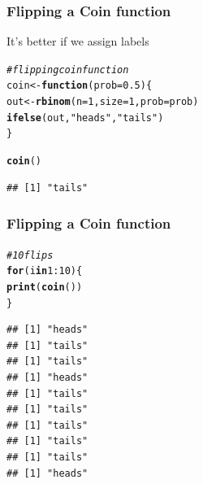 \documentclass[12pt]{beamer}\usepackage[]{graphicx}\usepackage[]{color}
\makeatletter
\newcommand{\hlnum}[1]{\textcolor[rgb]{0.686,0.059,0.569}{#1}}%
\newcommand{\hlstr}[1]{\textcolor[rgb]{0.192,0.494,0.8}{#1}}%
\newcommand{\hlcom}[1]{\textcolor[rgb]{0.678,0.584,0.686}{\textit{#1}}}%
\newcommand{\hlopt}[1]{\textcolor[rgb]{0,0,0}{#1}}%
\newcommand{\hlstd}[1]{\textcolor[rgb]{0.345,0.345,0.345}{#1}}%
\newcommand{\hlkwa}[1]{\textcolor[rgb]{0.161,0.373,0.58}{\textbf{#1}}}%
\newcommand{\hlkwb}[1]{\textcolor[rgb]{0.69,0.353,0.396}{#1}}%
\newcommand{\hlkwc}[1]{\textcolor[rgb]{0.333,0.667,0.333}{#1}}%
\newcommand{\hlkwd}[1]{\textcolor[rgb]{0.737,0.353,0.396}{\textbf{#1}}}%
\newenvironment{kframe}{%
 \def\at@end@of@kframe{}%
 \ifinner\ifhmode%
  \def\at@end@of@kframe{\end{minipage}}%
  \begin{minipage}{\columnwidth}%
 \fi\fi%
 \def\FrameCommand##1{\hskip\@totalleftmargin \hskip-\fboxsep
 \colorbox{shadecolor}{##1}\hskip-\fboxsep
     \hskip-\linewidth \hskip-\@totalleftmargin \hskip\columnwidth}%
 \MakeFramed {\advance\hsize-\width
   \@totalleftmargin\z@ \linewidth\hsize
   \@setminipage}}%
 {\par\unskip\endMakeFramed%
 \at@end@of@kframe}
\newenvironment{knitrout}{}{} %
\makeatother
\begin{document}

\begin{frame}[fragile]
\frametitle{Flipping a Coin function}

It's better if we assign labels
\begin{knitrout}\footnotesize
{}\color{fgcolor}\begin{kframe}
\begin{alltt}
\hlcom{# flipping coin function}
\hlstd{coin} \hlkwb{<-} \hlkwa{function}\hlstd{(}\hlkwc{prob} \hlstd{=} \hlnum{0.5}\hlstd{) \{}
  \hlstd{out} \hlkwb{<-} \hlkwd{rbinom}\hlstd{(}\hlkwc{n} \hlstd{=} \hlnum{1}\hlstd{,} \hlkwc{size} \hlstd{=} \hlnum{1}\hlstd{,} \hlkwc{prob} \hlstd{= prob)}
  \hlkwd{ifelse}\hlstd{(out,} \hlstr{"heads"}\hlstd{,} \hlstr{"tails"}\hlstd{)}
\hlstd{\}}

\hlkwd{coin}\hlstd{()}
\end{alltt}
\begin{verbatim}
## [1] "tails"
\end{verbatim}
\end{kframe}
\end{knitrout}

\end{frame}


\begin{frame}[fragile]
\frametitle{Flipping a Coin function}

\begin{knitrout}\footnotesize
{}\color{fgcolor}\begin{kframe}
\begin{alltt}
\hlcom{# 10 flips}
\hlkwa{for} \hlstd{(i} \hlkwa{in} \hlnum{1}\hlopt{:}\hlnum{10}\hlstd{) \{}
  \hlkwd{print}\hlstd{(}\hlkwd{coin}\hlstd{())}
\hlstd{\}}
\end{alltt}
\begin{verbatim}
## [1] "heads"
## [1] "tails"
## [1] "tails"
## [1] "heads"
## [1] "tails"
## [1] "tails"
## [1] "tails"
## [1] "tails"
## [1] "tails"
## [1] "heads"
\end{verbatim}
\end{kframe}
\end{knitrout}

\end{frame}

\end{document}
